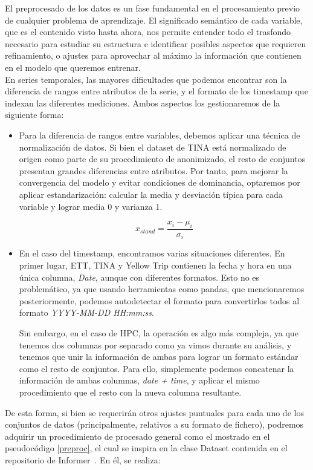 El preprocesado de los datos es un fase fundamental en el procesamiento previo de cualquier problema de aprendizaje. El significado semántico de cada variable, que es el contenido visto hasta ahora, nos permite entender todo el trasfondo necesario para estudiar su estructura e identificar posibles aspectos que requieren refinamiento, o ajustes para aprovechar al máximo la información que contienen en el modelo que queremos entrenar.\\

En series temporales, las mayores dificultades que podemos encontrar son la diferencia de rangos entre atributos de la serie, y el formato de los timestamp que indexan las diferentes mediciones. Ambos aspectos los gestionaremos de la siguiente forma:

\begin{itemize}
	\item Para la diferencia de rangos entre variables, debemos aplicar una técnica de normalización de datos. Si bien el dataset de TINA está normalizado de origen como parte de su procedimiento de anonimizado, el resto de conjuntos presentan grandes diferencias entre atributos. Por tanto, para mejorar la convergencia del modelo y evitar condiciones de dominancia, optaremos por aplicar estandarización: calcular la media y desviación típica para cada variable y lograr media 0 y varianza 1.
	
	$$x_{stand} = \frac{x_i - \mu_i}{\sigma_i}$$
	\item En el caso del timestamp, encontramos varias situaciones diferentes. En primer lugar, ETT, TINA y Yellow Trip contienen la fecha y hora en una única columna, \textit{Date}, aunque con diferentes formatos. Esto no es problemático, ya que usando herramientas como pandas, que mencionaremos posteriormente, podemos autodetectar el formato para convertirlos todos al formato \textit{YYYY-MM-DD HH:mm:ss}.
	
	Sin embargo, en el caso de HPC, la operación es algo más compleja, ya que tenemos dos columnas por separado como ya vimos durante su análisis, y tenemos que unir la información de ambas para lograr un formato estándar como el resto de conjuntos. Para ello, simplemente podemos concatenar la información de ambas columnas, \textit{date + time}, y aplicar el mismo procedimiento que el resto con la nueva columna resultante.
\end{itemize}

De esta forma, si bien se requerirán otros ajustes puntuales para cada uno de los conjuntos de datos (principalmente, relativos a su formato de fichero), podremos adquirir un procedimiento de procesado general como el mostrado en el pseudocódigo \ref{preproc}, el cual se inspira en la clase Dataset contenida en el repositorio de Informer~\cite{zhouhaoyi2020informer}. En él, se realiza:

